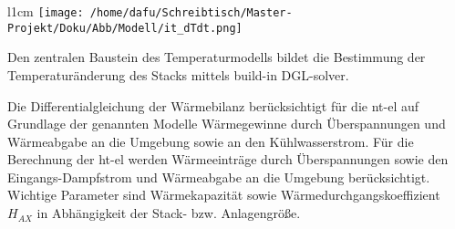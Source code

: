 \documentclass[onecolumn,10pt,titlepage]{article}
\begin{document}
\begin{wrapfigure}{l}{1cm}
	\texttt{[image: /home/dafu/Schreibtisch/Master-Projekt/Doku/Abb/Modell/it\_dTdt.png]}
\end{wrapfigure}
Den zentralen Baustein des Temperaturmodells bildet die Bestimmung der Temperaturänderung des Stacks mittels build-in DGL-solver.

Die Differentialgleichung der Wärmebilanz berücksichtigt für die \gls{nt}-\gls{el} auf Grundlage der genannten Modelle Wärmegewinne durch Überspannungen und  Wärmeabgabe an die Umgebung sowie an den Kühlwasserstrom. Für die Berechnung der \gls{ht}-\gls{el} werden Wärmeeinträge durch Überspannungen sowie den Eingangs-Dampfstrom und  Wärmeabgabe an die Umgebung berücksichtigt.\\





Wichtige Parameter sind Wärmekapazität sowie Wärmedurchgangskoeffizient $H_{AX}$ in Abhängigkeit der Stack- bzw. Anlagengröße.
\newline


%
\end{document}
